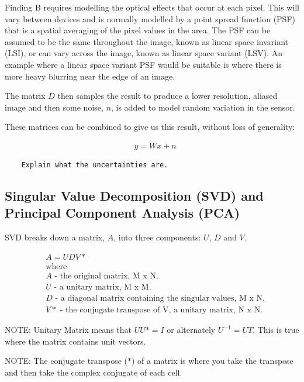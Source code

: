\documentclass[
  oneside,
  11pt, a4paper,
  footinclude=true,
  headinclude=true,
  cleardoublepage=empty
]{scrbook}
\begin{document}
Finding B requires modelling the optical effects that occur at each pixel. This will vary between devices and is normally modelled by a point spread function (PSF) that is a spatial averaging of the pixel values in the area. The PSF can be assumed to be the same throughout the image, known as linear space invariant (LSI), or can vary across the image, known as linear space variant (LSV). An example where a linear space variant PSF would be suitable is where there is more heavy blurring near the edge of an image.

The matrix $D$ then samples the result to produce a lower resolution, aliased image and then some noise, $n$, is added to model random variation in the sensor.

These matrices can be combined to give us this result, without loss of generality:

\begin{align}
& y = Wx + n \nonumber
\end{align}

\begin{verbatim}
	Explain what the uncertainties are.
\end{verbatim}

\subsection{Singular Value Decomposition (SVD) and Principal Component Analysis (PCA)}
SVD breaks down a matrix, $A$, into three components: $U$, $D$ and $V$.

\begin{align}
& A = UDV* \nonumber \\
& \text{where} \nonumber \\
& A \text{ - the original matrix, M x N.} \nonumber \\
& U \text{ - a unitary matrix, M x M.} \nonumber \\
& D \text{ - a diagonal matrix containing the singular values, M x N.} \nonumber \\
& V* \text{ - the conjugate transpose of V, a unitary matrix, N x N.} \nonumber
\end{align}

NOTE: Unitary Matrix means that $UU* = I$ or alternately $U^{-1} = UT$. This is true where the matrix contains unit vectors.

NOTE: The conjugate transpose ($*$) of a matrix is where you take the transpose and then take the complex conjugate of each cell.
\end{document}
